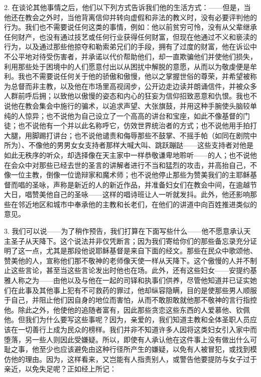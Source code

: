 2. 在谈论其他事情之后，他们以下列方式告诉我们他的生活方式：——但是，当他还在教会之外时，当他背离信仰并转向虚假和非法的教义时，没有必要评判他的行为。我们也不需要说任何这类的事情，例如：他以前贫穷可怜，没有从父辈继承任何财产，也没有通过技艺或任何行业获得任何财富，但现在他通过不义和亵渎的行为，以及通过那些他掠夺和勒索弟兄们的手段，拥有了过度的财富，他在诉讼中不公平地对待受伤害者，并承诺以代价帮助他们，却一直欺骗他们并使他们损失，利用那些处于困境中的人们愿意付出以从困扰中解脱的意愿，从而以为敬虔便是牟利。我也不需要说任何关于他的骄傲和傲慢，他以之掌握世俗的尊荣，并希望被称为总督而非主教，以及他在市场里高视阔步，公开边走边读并朗诵信件，并被众多人群前呼后拥；以致他以傲慢的姿态和内心的狂妄为信仰招致恶意和仇恨。我也不说他在教会集会中施行的骗术，以追求声望、大张旗鼓，并用这种手腕使头脑较单纯的人惊异；也不说他为自己设立了一个高高的讲台和宝座，如此不像基督的门徒；也不说他有一个并以此名称呼它，仿效世界统治者的方式；也不说他用手拍打大腿，用脚踢打讲台；也不说他谴责和侮辱那些不鼓掌、不摇手帕（如同在剧院中所为）、不像他的男男女女支持者那样大喊大叫、跳跃蹦跶——这些支持者对他是如此无秩序的听众，却选择像在天主家中一样恭敬谦卑地聆听——的人；也不说他在会众中对那些已经去世的圣言的讲解者进行不当和猛烈的攻击，并高抬自己，不像一位主教，倒像一位诡辩家和魔术师；也不说他停止那些为赞美我们的主耶稣基督而唱的圣咏，声称是新近的人的新近作品，并准备妇女们在教会中间，在逾越节大日，唱赞美他自己的圣咏——这样的唱诗班让人一听就发抖。此外，他还影响那些在邻近地区和城市中奉承他的主教和长老们，在他们的讲道中向百姓推进类似的意见。\par

3. 我们可以说——为了稍作预告，我们打算在下面写些什么——他不愿意承认天主圣子从天降下。这个说法并非仅凭断言；因为我们寄给你们的那些备忘录充分证明了这一点，尤其是那段他说耶稣基督是来自下面的经文。那些在民众中歌颂他、赞美他的人，宣称他们那不敬神的老师像天使一样从天降下。这个傲慢的人并不制止这些言论，甚至当这些言论发出时他也在场。此外，还有这些妇女——安提约基雅人称之为——由他以及与他在一起的司铎和执事们供养，尽管他知道并已证实她们在此事及其他事上犯有不可救药的罪过，他却纵容隐瞒，目的是使那些男人顺服于自己，并阻止他们因自身的地位而害怕，从而不敢胆敢就他那不敬神的言行指控他。除此之外，他使他的追随者富有，因此那些贪恋这些东西的人爱慕他、钦佩他。但我们为什么要写这些事呢？因为，亲爱的，我们知道主教和全体圣职人员应该在一切善行上成为民众的榜样。我们并非不知道许多人因将这类妇女引入家中而堕落，另一些人则因此受嫌疑。所以，即使有人承认他在这件事上没有做出什么可耻之事，他至少也应该避免由这种行径所产生的嫌疑，以免有人被冒犯，或找到模仿他的理由。因为，这样看来，又岂能有人指责别人，或警告他要提防与女子过于亲近，以免失足呢？正如经上所记：\par

